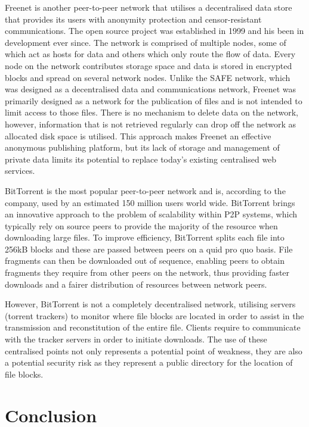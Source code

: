 \documentclass[twocolumn,english]{article}
\begin{document}
Freenet is another peer-to-peer network that utilises a decentralised data store that provides its users with anonymity protection and censor-resistant communications. The open source
project was established in 1999 and his been in development ever since. The network is comprised of multiple nodes, some of which act as hosts for data and others which only route the 
flow of data. Every node on the network contributes storage space and data is stored in encrypted blocks and spread on several network nodes. 
Unlike the SAFE network, which was designed as a decentralised data and communications network, Freenet was primarily designed as a network for the publication of files and is not 
intended to limit access to those files. There is no mechanism to delete data on the network, however, information that is not retrieved regularly can drop off the network as allocated disk 
space is utilised. This approach makes Freenet an effective anonymous publishing platform, but its lack of storage and management of private data limits its potential to replace today's
existing centralised web services. 

BitTorrent is the most popular peer-to-peer network and is, according to the company, used by an estimated 150 million users world wide.  BitTorrent brings an innovative 
approach to the problem of scalability within P2P systems, which typically rely on source peers to provide the majority of the resource when downloading large files. To improve
efficiency, BitTorrent splits each file into 256kB blocks and these are passed between peers on a quid pro quo basis. File fragments can then be downloaded out of sequence, enabling 
peers to obtain fragments they require from other peers on the network, thus providing faster downloads and a fairer distribution of resources between network peers.

However, BitTorrent is not a completely decentralised network, utilising servers (torrent trackers) to monitor where file blocks are located in order to assist in the transmission and 
reconstitution of the entire file. Clients require to communicate with the tracker servers in order to initiate downloads. The use of these centralised points not only represents a potential
point of weakness, they are also a potential security risk as they represent a public directory for the location of file blocks.

\section*{Conclusion}
\end{document}
